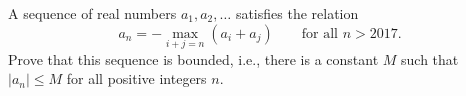 A sequence of real numbers $a_1, a_2, \ldots$ satisfies the relation
\[
a_n = -\max_{i+j=n} (a_i + a_j) \qquad \text{for all } n > 2017.
\]
Prove that this sequence is bounded, i.e., there is a constant $M$ such that $|a_n| \leq M$ for all positive integers $n$.
